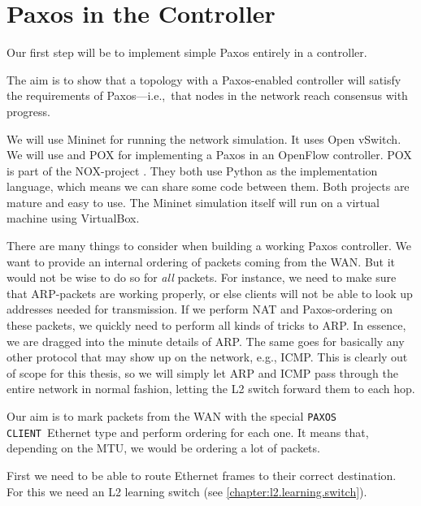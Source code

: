 \section{Paxos in the Controller}

Our first step will be to implement simple Paxos \cite{Lam01} entirely in a
controller.

The aim is to show that a topology with a Paxos-enabled controller will
satisfy the requirements of Paxos---i.e.,~that nodes in the network reach
consensus with progress.

We will use Mininet \cite{Lantz:2010:NLR:1868447.1868466} for
running the network simulation.  It uses Open vSwitch.
We will use and POX \cite{POX.1} for
implementing a Paxos in an OpenFlow controller.  POX is part of the
NOX-project \cite{Gude:2008:NTO:1384609.1384625}.
%
They both use Python
\cite{vanRossum:2009:PRM:1610526} as the implementation language, which
means we can share some code between them.  Both projects are mature and
easy to use.  The Mininet simulation itself will run on a virtual machine
using VirtualBox.

There are many things to consider when building a working Paxos controller.
We want to provide an internal ordering of packets coming from the \ac{WAN}.
But it would not be wise to do so for \textit{all} packets. For instance, we
need to make sure that \ac{ARP}-packets are working properly, or else
clients will not be able to look up addresses needed for transmission.
If we perform \ac{NAT} and Paxos-ordering on these packets, we quickly need
to perform all kinds of tricks to \acs{ARP}.  In essence, we are dragged
into the minute details of \acs{ARP}.  The same goes for basically any other
protocol that may show up on the network, e.g., \ac{ICMP}.
%
This is clearly out of scope for this
thesis, so we will simply let \acs{ARP} and \acs{ICMP} pass through the
entire network in normal fashion, letting the \acs{L2} switch forward them
to each hop.

Our aim is to mark packets from the \ac{WAN} with the special
\texttt{PAXOS CLIENT} Ethernet type and perform ordering for each one.
It means that, depending on the \ac{MTU}, we would be ordering a lot of
packets.

First we need to be able to route Ethernet frames to their correct
destination. For this we need an \ac{L2} learning switch (see
    \vref{chapter:l2.learning.switch}).

